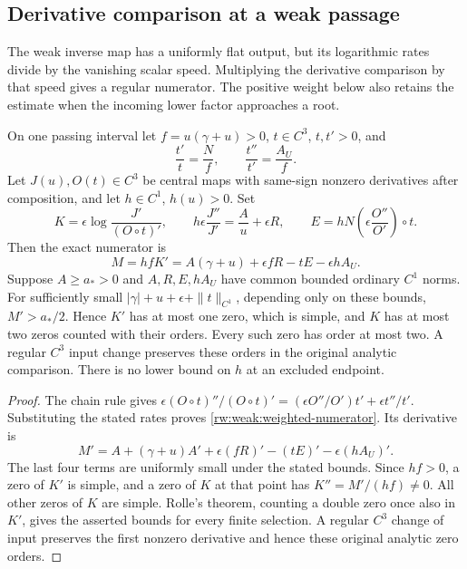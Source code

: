 \subsection{Derivative comparison at a weak passage}

The weak inverse map has a uniformly flat output, but its logarithmic
rates divide by the vanishing scalar speed.  Multiplying the derivative
comparison by that speed gives a regular numerator.  The positive
weight below also retains the estimate when the incoming lower
factor approaches a root.

\begin{lemma}\label{rw:weak:rate-calculus}
On one passing interval let $f=u(\gamma+u)>0$, $t\in C^3$, $t,t'>0$, and
\[
 \frac{t'}t=\frac Nf,\qquad
 \frac{t''}{t'}=\frac{A_U}f.
\]
Let $J(u),O(t)\in C^3$ be central maps with same-sign nonzero
derivatives after composition, and let $h\in C^1$, $h(u)>0$. Set
\[
 K=\epsilon\log\frac{J'}{(O\circ t)'},\qquad
 h\epsilon\frac{J''}{J'}=\frac A u+\epsilon R,
 \qquad E=hN\left(\epsilon\frac{O''}{O'}\right)\circ t.
\]
Then the exact numerator is
\begin{equation}\label{rw:weak:weighted-numerator}
 M=hfK'=A(\gamma+u)+\epsilon fR-tE-\epsilon hA_U.
\end{equation}
Suppose $A\ge a_*>0$ and $A,R,E,hA_U$ have common bounded
ordinary $C^1$ norms. For sufficiently small
$|\gamma|+u+\epsilon+\|t\|_{C^1}$, depending only on these bounds,
$M'>a_*/2$. Hence $K'$ has at most one zero, which is simple, and
$K$ has at most two zeros counted with their orders. Every such zero
has order at most two. A regular $C^3$ input change preserves these
orders in the original analytic comparison. There is no lower bound
on $h$ at an excluded endpoint.
\end{lemma}
\begin{proof}
The chain rule gives
$\epsilon(O\circ t)''/(O\circ t)'=
 (\epsilon O''/O')t'+\epsilon t''/t'$.
Substituting the stated rates proves
\eqref{rw:weak:weighted-numerator}. Its derivative is
\[
 M'=A+(\gamma+u)A'+\epsilon(fR)'-(tE)'
                                      -\epsilon(hA_U)'.
\]
The last four terms are uniformly small under the stated bounds.
Since $hf>0$, a zero of $K'$ is simple, and a zero of $K$ at that
point has $K''=M'/(hf)\ne0$. All other zeros of $K$ are simple.
Rolle's theorem, counting a double zero once also in $K'$, gives
the asserted bounds for every finite selection. A regular $C^3$
change of input preserves the first nonzero derivative and hence
these original analytic zero orders.
\end{proof}
